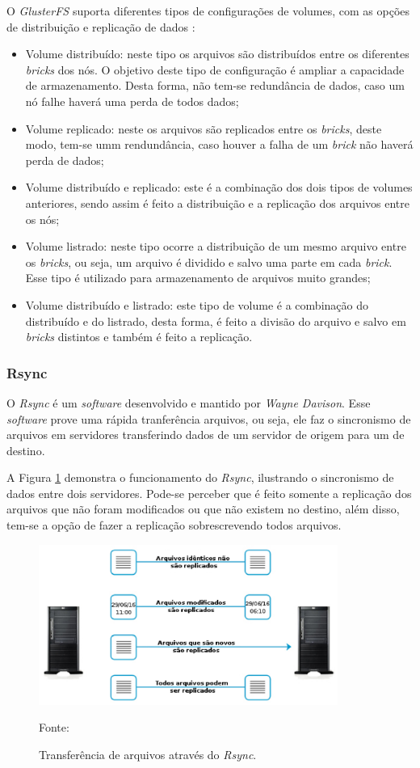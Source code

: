 O \textit{GlusterFS} suporta diferentes tipos de configurações de volumes, com as opções de distribuição e replicação de dados \cite{glusterfs}:
\begin{itemize}
 \item Volume distribuído: neste tipo os arquivos são distribuídos entre os diferentes \textit{bricks} dos nós. O objetivo deste tipo de 
 configuração é ampliar a capacidade de armazenamento. Desta forma, não tem-se redundância de dados, caso um nó falhe haverá uma perda de todos 
 dados;
 \item Volume replicado: neste os arquivos são replicados entre os \textit{bricks}, deste modo, tem-se umm rendundância, caso houver a falha de 
 um \textit{brick} não haverá perda de dados;
 \item Volume distribuído e replicado: este é a combinação dos dois tipos de volumes anteriores, sendo assim é feito a distribuição 
 e a replicação dos arquivos entre os nós;
 \item Volume listrado: neste tipo ocorre a distribuição de um mesmo arquivo entre os \textit{bricks}, ou seja, um arquivo é dividido e salvo uma
 parte em cada \textit{brick}. Esse tipo é utilizado para armazenamento de arquivos muito grandes;
 \item Volume distribuído e listrado: este tipo de volume é a combinação do distribuído e do listrado, desta forma, é feito a divisão do arquivo 
 e salvo em \textit{bricks} distintos e também é feito a replicação.
\end{itemize}

\subsubsection{Rsync}
\label{section:rsync}
O \textit{Rsync} \cite{rsync} é um \textit{software} desenvolvido e mantido por \textit{Wayne Davison}. Esse \textit{software} prove uma rápida
tranferência arquivos, ou seja, ele faz o sincronismo de arquivos em servidores transferindo dados de um servidor de origem para um de destino.

A Figura \ref{fig:rsync} demonstra o funcionamento do \textit{Rsync}, ilustrando o sincronismo de dados entre dois servidores. Pode-se perceber
que é feito somente a replicação dos arquivos que não foram modificados ou que não existem no destino, além disso, tem-se a opção de fazer a 
replicação sobrescrevendo todos arquivos.

\begin{figure}[h!]
 \centering
 \includegraphics[width=370px]{img/rsync.eps}
 \caption{Transferência de arquivos através do \textit{Rsync}.}
 Fonte: \citet{lopez2012}
 \label{fig:rsync}
\end{figure}

